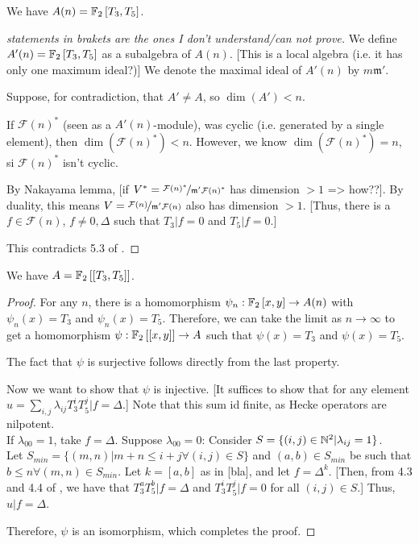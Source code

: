 \begin{property}
	We have $A(n) = \mathbb{F}_2 \left[ T_3, T_5 \right]$.
\end{property}
\begin{proof}
	[statements in brakets are the ones I don't understand/can not prove]
	We define $A'(n) = \mathbb{F}_2 \left[ T_3, T_5 \right]$ as a subalgebra of $A(n)$.
	[This is a local algebra (i.e. it has only one maximum ideal?)]
	We denote the maximal ideal of $A'(n)$ by $m\mathfrak{m}'$.
	
	Suppose, for contradiction, that $A' \neq A$, so $\dim(A') < n$.
	
	If $\mathcal{F}(n)^*$ (seen as a $A'(n)$-module), was cyclic (i.e. generated by a single element), then $\dim(\mathcal{F}(n)^*) < n$.
	However, we know $\dim(\mathcal{F}(n)^*)=n$, si $\mathcal{F}(n)^*$ isn't cyclic.
	
	By Nakayama lemma, [if $V^*=\nicefrac{\mathcal{F}(n)^*}{\mathfrak{m}'\mathcal{F}(n)^*}$ has dimension $>1$ => how??].
	By duality, this means $V=\nicefrac{\mathcal{F}(n)}{\mathfrak{m}'\mathcal{F}(n)}$ also has dimension $>1$.
	[Thus, there is a $f \in \mathcal{F}(n)$, $f \neq 0, \Delta$ such that $T_3|f=0$ and $T_5|f=0$.]
	
	This contradicts 5.3 of \cite{OrdreNilpotenceOperateurHecke}.
\end{proof}

\begin{property}
	We have $A = \mathbb{F}_2 \left[\left[ T_3, T_5 \right]\right]$.
\end{property}
\begin{proof}
	For any $n$, there is a homomorphism $\psi_n: \mathbb{F}_2 \left[ x, y \right] \to A(n)$ with $\psi_n(x) = T_3$ and $\psi_n(x) = T_5$.
	Therefore, we can take the limit as $n \to \infty$ to get a homomorphism $\psi: \mathbb{F}_2 \left[\left[ x, y \right]\right] \to A$ such that $\psi(x) = T_3$ and $\psi(x) = T_5$.
	
	The fact that $\psi$ is surjective follows directly from the last property.
	
	Now we want to show that $\psi$ is injective.
	[It suffices to show that for any element $u = \sum_{i,j} \lambda_{ij}T_3^iT_5^j | f = \Delta$.]
	Note that this sum id finite, as Hecke operators are nilpotent.\\
	If $\lambda_{00}=1$, take $f=\Delta$.
	Suppose $\lambda_{00}=0$: Consider $S = \{ (i,j) \in \mathbb{N}^2 | \lambda_{ij}=1 \}$.\\
	Let $S_{min} = \{ (m,n) | m+n \leq i+j \forall (i,j) \in S \}$ and $(a,b) \in S_{min}$ be such that $b \leq n \forall (m,n) \in S_{min}$.
	Let $k = [a,b]$ as in [bla], and let $f = \Delta^k$.
	[Then, from 4.3 and 4.4 of \cite{OrdreNilpotenceOperateurHecke}, we have that $T_3^aT_5^b|f=\Delta$ and $T_3^iT_5^j|f=0$ for all $(i,j) \in S$.]
	Thus, $u|f = \Delta$.
	
	Therefore, $\psi$ is an isomorphism, which completes the proof.
\end{proof}



